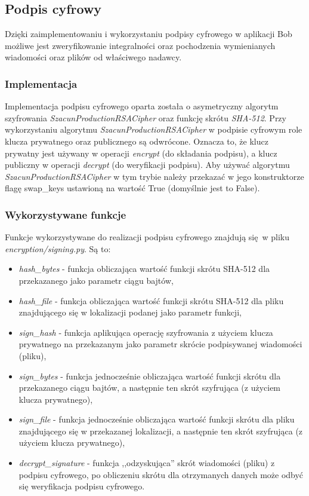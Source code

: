\documentclass{article}
\begin{document}
  \subsection{Podpis cyfrowy}
    Dzięki zaimplementowaniu i wykorzystaniu podpisy cyfrowego w aplikacji Bob możliwe jest zweryfikowanie integralności
    oraz pochodzenia wymienianych wiadomości oraz plików od właściwego nadawcy.

    \subsubsection{Implementacja}
      Implementacja podpisu cyfrowego oparta została o asymetryczny algorytm szyfrowania \emph{SzacunProductionRSACipher}
      oraz funkcję skrótu \emph{SHA-512}. Przy wykorzystaniu algorytmu \emph{SzacunProductionRSACipher} w podpisie cyfrowym
      role klucza prywatnego oraz publicznego są odwrócone. Oznacza to, że klucz prywatny jest używany w operacji \emph{encrypt}
      (do składania podpisu), a klucz publiczny w operacji \emph{decrypt} (do weryfikacji podpisu). Aby używać algorytmu
      \emph{SzacunProductionRSACipher} w tym trybie należy przekazać w jego konstruktorze flagę swap\_keys ustawioną
      na wartość True (domyślnie jest to False).

      \subsubsection{Wykorzystywane funkcje}
        Funkcje wykorzystywane do realizacji podpisu cyfrowego znajdują się w pliku \emph{encryption/signing.py}.
        Są to:

        \begin{itemize}
          \item \emph{hash\_bytes} - funkcja obliczająca wartość funkcji skrótu SHA-512 dla przekazanego
            jako parametr ciągu bajtów,
          \item \emph{hash\_file} - funkcja obliczająca wartość funkcji skrótu SHA-512 dla pliku znajdującego
            się w lokalizacji podanej jako parametr funkcji,
          \item \emph{sign\_hash} - funkcja aplikująca operację szyfrowania z użyciem klucza prywatnego na przekazanym
            jako parametr skrócie podpisywanej wiadomości (pliku),
          \item \emph{sign\_bytes} - funkcja jednocześnie obliczająca wartość funkcji skrótu dla przekazanego ciągu
            bajtów, a następnie ten skrót szyfrująca (z użyciem klucza prywatnego),
          \item \emph{sign\_file} - funkcja jednocześnie obliczająca wartość funkcji skrótu dla pliku znajdującego się
            w przekazanej lokalizacji, a następnie ten skrót szyfrująca (z użyciem klucza prywatnego),
         \item \emph{decrypt\_signature} - funkcja ,,odzyskująca'' skrót wiadomości (pliku) z podpisu cyfrowego,
           po obliczeniu skrótu dla otrzymanych danych może odbyć się weryfikacja podpisu cyfrowego.
        \end{itemize}
\end{document}
